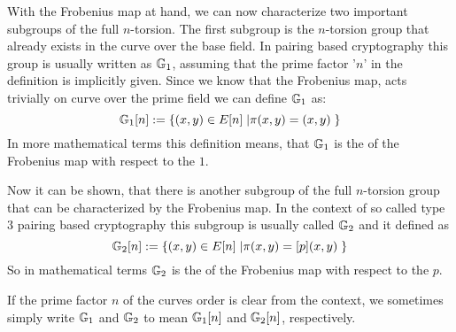 With the Frobenius map at hand, we can now characterize two important subgroups of the full $n$-torsion. The first subgroup is the $n$-torsion group that already exists in the curve over the base field. In pairing based cryptography this group is usually written as $\mathbb{G}_1$, assuming that the prime factor '$n$' in the definition is implicitly given. Since we know that the Frobenius map, acts trivially on curve over the prime field we can define $\mathbb{G}_1$ as:
\begin{equation}
\mathbb{G}_1[n] := \{(x,y)\in E[n]\;| \pi(x,y) = (x,y)\;\}
\end{equation}
In more mathematical terms this definition means, that $\mathbb{G}_1$ is the  of the Frobenius map with respect to the  $1$.

Now it can be shown, that there is another subgroup of the full $n$-torsion group that can be characterized by the Frobenius map. In the context of so called type $3$ pairing based cryptography this subgroup is usually called $\mathbb{G}_2$ and it defined as 
\begin{equation}
\mathbb{G}_2[n] := \{(x,y)\in E[n]\;| \pi(x,y) = [p](x,y)\;\}
\end{equation}
So in mathematical terms $\mathbb{G}_2$ is the  of the Frobenius map with respect to the  $p$.
\begin{notation}
If the prime factor $n$ of the curves order is clear from the context, we sometimes simply write $\mathbb{G}_1$ and $\mathbb{G}_2$ to mean $\mathbb{G}_1[n]$ and $\mathbb{G}_2[n]$, respectively.
\end{notation}

